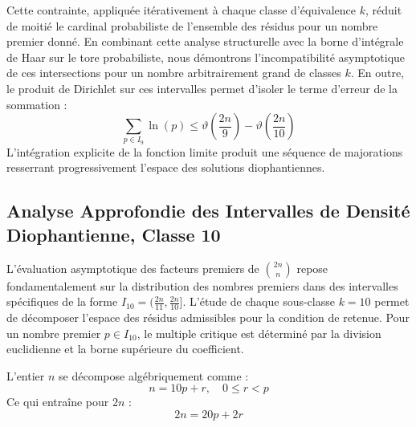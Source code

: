 \documentclass[12pt,a4paper]{article}
\begin{document}
    Cette contrainte, appliquée itérativement à chaque classe d'équivalence $k$, réduit de moitié le cardinal probabiliste de l'ensemble des résidus pour un nombre premier donné.
    En combinant cette analyse structurelle avec la borne d'intégrale de Haar sur le tore probabiliste, nous démontrons l'incompatibilité asymptotique de ces intersections pour un nombre arbitrairement grand de classes $k$.
    En outre, le produit de Dirichlet sur ces intervalles permet d'isoler le terme d'erreur de la sommation :
    \begin{equation}
    \sum_{p \in I_9} \ln(p) \le \vartheta\left(\frac{2n}{9}\right) - \vartheta\left(\frac{2n}{10}\right)
    \end{equation}
    L'intégration explicite de la fonction limite produit une séquence de majorations resserrant progressivement l'espace des solutions diophantiennes.
    
    \newpage
    \subsection{Analyse Approfondie des Intervalles de Densité Diophantienne, Classe 10}
    L'évaluation asymptotique des facteurs premiers de $\binom{2n}{n}$ repose fondamentalement sur la distribution des nombres premiers dans des intervalles spécifiques de la forme $I_10 = (\frac{2n}{11}, \frac{2n}{10}]$.
    L'étude de chaque sous-classe $k = 10$ permet de décomposer l'espace des résidus admissibles pour la condition de retenue.
    Pour un nombre premier $p \in I_10$, le multiple critique est déterminé par la division euclidienne et la borne supérieure du coefficient.

    L'entier $n$ se décompose algébriquement comme :
    \begin{equation}
    n = 10 p + r, \quad 0 \le r < p
    \end{equation}
    Ce qui entraîne pour $2n$ :
    \begin{equation}
    2n = 20 p + 2r
    \end{equation}
\end{document}
